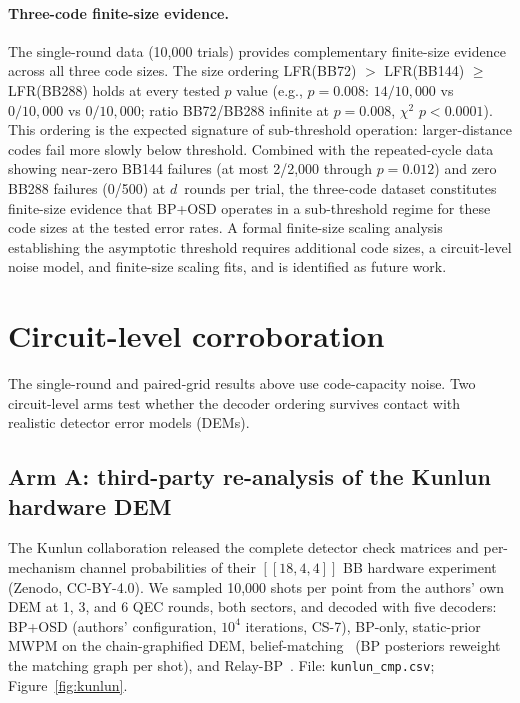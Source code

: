 \documentclass[11pt,a4paper]{article}
\begin{document}
\paragraph{Three-code finite-size evidence.}
The single-round data (10{,}000 trials) provides complementary
finite-size evidence across all three code sizes.
The size ordering LFR(BB72) $>$ LFR(BB144) $\ge$ LFR(BB288) holds
at every tested $p$ value
(e.g., $p=0.008$: $14/10{,}000$ vs $0/10{,}000$ vs $0/10{,}000$;
ratio BB72/BB288 infinite at $p=0.008$, $\chi^2$ $p<0.0001$).
This ordering is the expected signature of sub-threshold operation:
larger-distance codes fail more slowly below threshold.
Combined with the repeated-cycle data showing near-zero BB144 failures (at most 2/2{,}000
through $p=0.012$) and zero BB288 failures (0/500) at $d$~rounds per trial, the three-code dataset
constitutes finite-size evidence that BP+OSD operates in a sub-threshold
regime for these code sizes at the tested error rates.
A formal finite-size scaling analysis establishing the asymptotic threshold
requires additional code sizes, a circuit-level noise model, and
finite-size scaling fits, and is identified as future work.

\section{Circuit-level corroboration}
\label{sec:circuit}

The single-round and paired-grid results above use code-capacity noise.
Two circuit-level arms test whether the decoder ordering survives contact
with realistic detector error models (DEMs).

\subsection{Arm A: third-party re-analysis of the Kunlun hardware DEM}

The Kunlun collaboration released the complete detector check matrices and
per-mechanism channel probabilities of their $[[18,4,4]]$ BB hardware
experiment~\cite{Wang2026kunlun} (Zenodo, CC-BY-4.0). We sampled
10{,}000 shots per point from the authors' own DEM at 1, 3, and 6 QEC
rounds, both sectors, and decoded with five decoders: BP+OSD (authors'
configuration, $10^4$ iterations, CS-7), BP-only, static-prior MWPM on the
chain-graphified DEM, belief-matching~\cite{Higgott2023belief} (BP
posteriors reweight the matching graph per shot), and
Relay-BP~\cite{Muller2025relay}. File: \texttt{kunlun\_cmp.csv};
Figure~\ref{fig:kunlun}.
\end{document}
